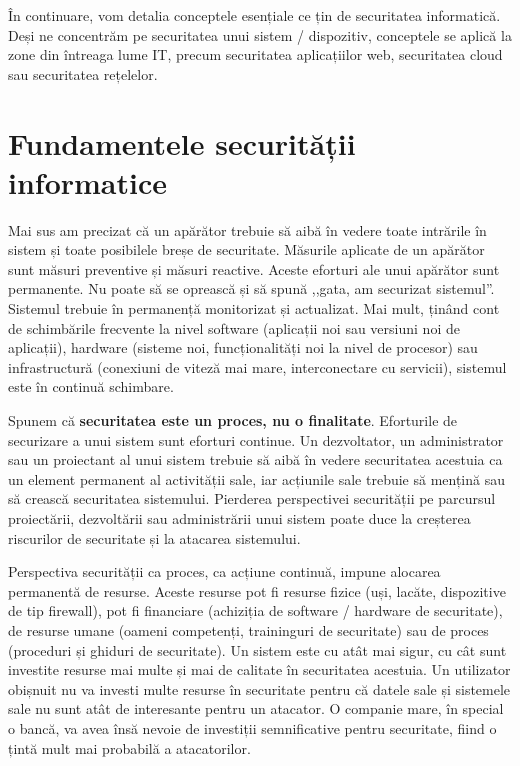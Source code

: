 În continuare, vom detalia conceptele esențiale ce țin de securitatea informatică.
Deși ne concentrăm pe securitatea unui sistem / dispozitiv, conceptele se aplică la zone din întreaga lume IT, precum securitatea aplicațiilor web, securitatea cloud sau securitatea rețelelor.

\section{Fundamentele securității informatice}
\label{sec:sec:fundamentals}

Mai sus am precizat că un apărător trebuie să aibă în vedere toate intrările în sistem și toate posibilele breșe de securitate.
Măsurile aplicate de un apărător sunt măsuri preventive și măsuri reactive.
Aceste eforturi ale unui apărător sunt permanente.
Nu poate să se oprească și să spună ,,gata, am securizat sistemul''.
Sistemul trebuie în permanență monitorizat și actualizat.
Mai mult, ținând cont de schimbările frecvente la nivel software (aplicații noi sau versiuni noi de aplicații), hardware (sisteme noi, funcționalități noi la nivel de procesor) sau infrastructură (conexiuni de viteză mai mare, interconectare cu servicii), sistemul este în continuă schimbare.

Spunem că \textbf{securitatea este un proces, nu o finalitate}.
Eforturile de securizare a unui sistem sunt eforturi continue.
Un dezvoltator, un administrator sau un proiectant al unui sistem trebuie să aibă în vedere securitatea acestuia ca un element permanent al activității sale, iar acțiunile sale trebuie să mențină sau să crească securitatea sistemului.
Pierderea perspectivei securității pe parcursul proiectării, dezvoltării sau administrării unui sistem poate duce la creșterea riscurilor de securitate și la atacarea sistemului.

Perspectiva securității ca proces, ca acțiune continuă, impune alocarea permanentă de resurse.
Aceste resurse pot fi resurse fizice (uși, lacăte, dispozitive de tip firewall), pot fi financiare (achiziția de software / hardware de securitate), de resurse umane (oameni competenți, traininguri de securitate) sau de proces (proceduri și ghiduri de securitate).
Un sistem este cu atât mai sigur, cu cât sunt investite resurse mai multe și mai de calitate în securitatea acestuia.
Un utilizator obișnuit nu va investi multe resurse în securitate pentru că datele sale și sistemele sale nu sunt atât de interesante pentru un atacator.
O companie mare, în special o bancă, va avea însă nevoie de investiții semnificative pentru securitate, fiind o țintă mult mai probabilă a atacatorilor.

